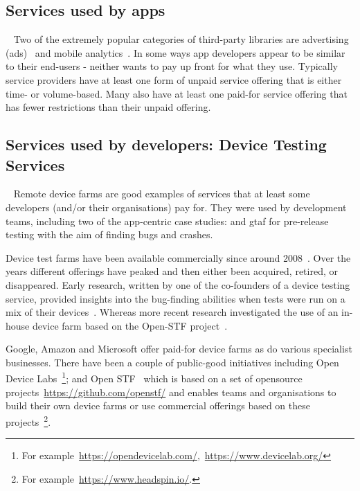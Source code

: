 \subsection{Services used by apps}~\label{rw-services-used-by-apps-topic}
Two of the extremely popular categories of third-party libraries are advertising (ads)~ and mobile analytics~.
In some ways app developers appear to be similar to their end-users - neither wants to pay up front for what they use. Typically service providers have at least one form of unpaid service offering that is either time- or volume-based. Many also have at least one paid-for service offering that has fewer restrictions than their unpaid offering.


\subsection{Services used by developers: Device Testing Services}~\label{rw-services-used-by-devs-device-testing-services}
Remote device farms are good examples of services that at least some developers (and/or their organisations) pay for. They were used by development teams, including two of the app-centric case studies:  and \Gls{gtaf} for pre-release testing with the aim of finding bugs and crashes.

Device test farms have been available commercially since around 2008~. Over the years different offerings have peaked and then either been acquired, retired, or disappeared.
Early research, written by one of the co-founders of a device testing service, provided insights into the bug-finding abilities when tests were run on a mix of their devices~. Whereas more recent research investigated the use of an in-house device farm based on the Open-STF project~. 

Google, Amazon and Microsoft offer paid-for device farms as do various specialist businesses. There have been a couple of public-good initiatives including Open Device Labs~\footnote{For example~\url{https://opendevicelab.com/},~\url{https://www.devicelab.org/}}; and Open STF~ which is based on a set of opensource projects~\url{https://github.com/openstf/} and enables teams and organisations to build their own device farms or use commercial offerings based on these projects~\footnote{For example~\url{https://www.headspin.io/}.}.

